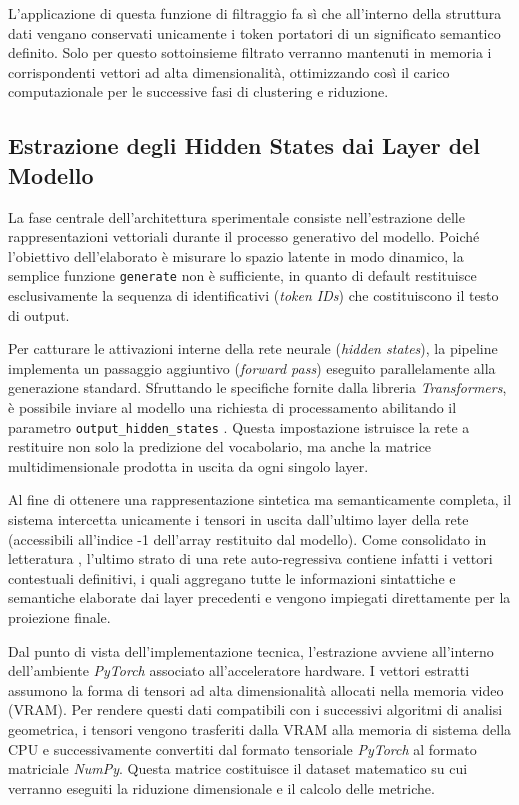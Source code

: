 L'applicazione di questa funzione di filtraggio fa sì che all'interno della struttura dati vengano conservati unicamente i token portatori di un significato semantico definito. Solo per questo sottoinsieme filtrato verranno mantenuti in memoria i corrispondenti vettori ad alta dimensionalità, ottimizzando così il carico computazionale per le successive fasi di clustering e riduzione.

\subsection{Estrazione degli Hidden States dai Layer del Modello}
\label{sec:estrazione_hidden_states}

La fase centrale dell'architettura sperimentale consiste nell'estrazione delle rappresentazioni vettoriali durante il processo generativo del modello. Poiché l'obiettivo dell'elaborato è misurare lo spazio latente in modo dinamico, la semplice funzione \texttt{generate} non è sufficiente, in quanto di default restituisce esclusivamente la sequenza di identificativi (\textit{token IDs}) che costituiscono il testo di output.

Per catturare le attivazioni interne della rete neurale (\textit{hidden states}), la pipeline implementa un passaggio aggiuntivo (\textit{forward pass}) eseguito parallelamente alla generazione standard. Sfruttando le specifiche fornite dalla libreria \textit{Transformers}, è possibile inviare al modello una richiesta di processamento abilitando il parametro \texttt{output\_hidden\_states} \cite{huggingface_transformers_docs}. Questa impostazione istruisce la rete a restituire non solo la predizione del vocabolario, ma anche la matrice multidimensionale prodotta in uscita da ogni singolo layer.

Al fine di ottenere una rappresentazione sintetica ma semanticamente completa, il sistema intercetta unicamente i tensori in uscita dall'ultimo layer della rete (accessibili all'indice -1 dell'array restituito dal modello). Come consolidato in letteratura \cite{belrose2023eliciting}, l'ultimo strato di una rete auto-regressiva contiene infatti i vettori contestuali definitivi, i quali aggregano tutte le informazioni sintattiche e semantiche elaborate dai layer precedenti e vengono impiegati direttamente per la proiezione finale.

Dal punto di vista dell'implementazione tecnica, l'estrazione avviene all'interno dell'ambiente \textit{PyTorch} associato all'acceleratore hardware. I vettori estratti assumono la forma di tensori ad alta dimensionalità allocati nella memoria video (VRAM). Per rendere questi dati compatibili con i successivi algoritmi di analisi geometrica, i tensori vengono trasferiti dalla VRAM alla memoria di sistema della CPU e successivamente convertiti dal formato tensoriale \textit{PyTorch} al formato matriciale \textit{NumPy}. Questa matrice costituisce il dataset matematico su cui verranno eseguiti la riduzione dimensionale e il calcolo delle metriche.

